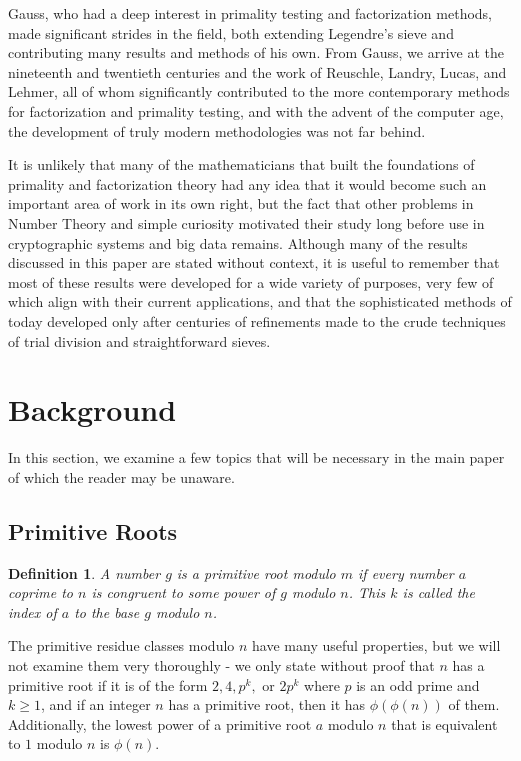 \documentclass{article}
\newtheorem*{definition}{Definition}
\begin{document}
\par Gauss, who had a deep interest in primality testing and factorization methods, made significant strides in the field, both extending Legendre's sieve and contributing many results and methods of his own. From Gauss, we arrive at the nineteenth and twentieth centuries and the work of Reuschle, Landry, Lucas, and Lehmer, all of whom significantly contributed to the more contemporary methods for factorization and primality testing, and with the advent of the computer age, the development of truly modern methodologies was not far behind. 
\par It is unlikely that many of the mathematicians that built the foundations of primality and factorization theory had any idea that it would become such an important area of work in its own right, but the fact that other problems in Number Theory and simple curiosity motivated their study long before use in cryptographic systems and big data remains. Although many of the results discussed in this paper are stated without context, it is useful to remember that most of these results were developed for a wide variety of purposes, very few of which align with their current applications, and that the sophisticated methods of today developed only after centuries of refinements made to the crude techniques of trial division and straightforward sieves.

\section*{Background}\label{Background}

In this section, we examine a few topics that will be necessary in the main paper of which the reader may be unaware. 


\subsection*{Primitive Roots}
\begin{definition}
A number $g$ is a \textit{primitive root} modulo $m$ if every number $a$ coprime to $n$ is congruent to some power of $g$ modulo $n$. This $k$ is called the index of $a$ to the base $g$ modulo $n$.
\end{definition}
\par The primitive residue classes modulo $n$ have many useful properties, but we will not examine them very thoroughly - we only state without proof that $n$ has a primitive root if it is of the form $2, 4, p^k, \text{ or } 2p^k$ where $p$ is an odd prime and $k \geq 1$, and if an integer $n$ has a primitive root, then it has $\phi(\phi(n))$ of them. Additionally, the lowest power of a primitive root $a$ modulo $n$ that is equivalent to $1$ modulo $n$ is $\phi(n)$.
\end{document}
